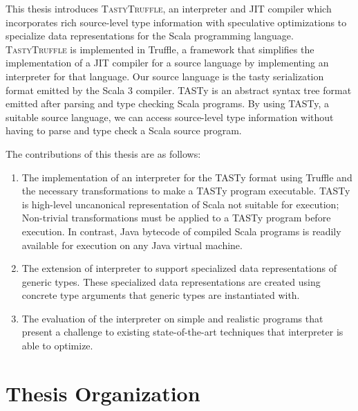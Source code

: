 This thesis introduces \textsc{TastyTruffle}, an interpreter and JIT compiler which incorporates rich source-level type information with speculative optimizations to specialize data representations for the Scala programming language.
\textsc{TastyTruffle} is implemented in Truffle, a framework that simplifies the implementation of a JIT compiler for a source language by implementing an interpreter for that language. 
Our source language is the \acrfull{tasty} serialization format emitted by the Scala 3 compiler.
TASTy is an abstract syntax tree format emitted after parsing and type checking Scala programs.
By using TASTy, a suitable source language, we can access source-level type information without having to parse and type check a Scala source program.

The contributions of this thesis are as follows: 
\begin{enumerate}
	\item The implementation of an interpreter for the TASTy format using Truffle and the necessary transformations to make a TASTy program executable. TASTy is high-level uncanonical representation of Scala not suitable for execution; Non-trivial transformations must be applied to a TASTy program before execution.
	In contrast, Java bytecode of compiled Scala programs is readily available for execution on any Java virtual machine.
	\item The extension of interpreter to support specialized data representations of generic types.
	These specialized data representations are created using concrete type arguments that generic types are instantiated with.
	\item The evaluation of the interpreter on simple and realistic programs that present a challenge to existing state-of-the-art techniques that interpreter is able to optimize.
\end{enumerate}

\newpage

\section{Thesis Organization}

